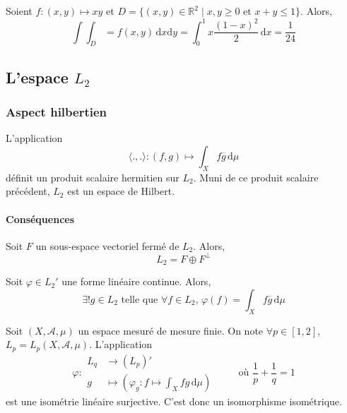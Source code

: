   \begin{example}
    Soient $f : (x,y) \mapsto xy$ et $D = \{ (x,y) \in \mathbb{R}^2 \mid x, y \geq 0 \text{ et } x + y \leq 1 \}$. Alors,
    \[ \int \int_D = f(x,y) \, \mathrm{d}x \mathrm{d}y = \int_0^1 x \frac{(1-x)^2}{2} \, \mathrm{d}x = \frac{1}{24} \]
  \end{example}

	\subsection{L'espace \texorpdfstring{$L_2$}{L₂}}

	\subsubsection{Aspect hilbertien}


	\begin{definition}
		L'application
		\[ \langle ., . \rangle : (f,g) \mapsto \int_X f \overline{g} \, \mathrm{d}\mu \]
		définit un produit scalaire hermitien sur $L_2$. Muni de ce produit scalaire précédent, $L_2$ est un espace de Hilbert.
	\end{definition}

	\paragraph{Conséquences}

	\begin{theorem}
		Soit $F$ un sous-espace vectoriel fermé de $L_2$. Alors,
		\[ L_2 = F \oplus F^\perp \]
	\end{theorem}

	\begin{corollary}
		Soit $\varphi \in L_2'$ une forme linéaire continue. Alors,
		\[ \exists! g \in L_2 \text{ telle que } \forall f \in L_2, \, \varphi(f) = \int_X f \overline{g} \, \mathrm{d}\mu \]
	\end{corollary}


	\begin{application}[Dual de $L_p$]
		Soit $(X, \mathcal{A}, \mu)$ un espace mesuré de mesure finie. On note $\forall p \in [1, 2]$, $L_p = L_p(X, \mathcal{A}, \mu)$. L'application
		\[
		\varphi :
		\begin{array}{ll}
			L_q &\rightarrow (L_p)' \\
			g &\mapsto \left( \varphi_g : f \mapsto \int_X f g \, \mathrm{d}\mu \right)
		\end{array}
		\qquad \text{ où } \frac{1}{p} + \frac{1}{q} = 1
		\]
		est une isométrie linéaire surjective. C'est donc un isomorphisme isométrique.
	\end{application}

